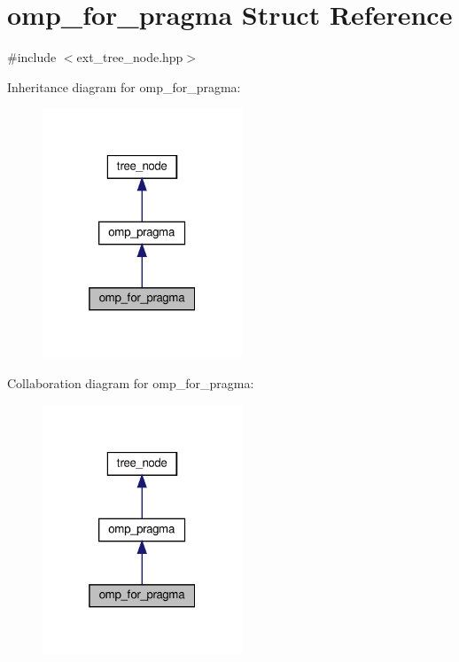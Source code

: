 \hypertarget{structomp__for__pragma}{}\section{omp\+\_\+for\+\_\+pragma Struct Reference}
\label{structomp__for__pragma}


{\ttfamily \#include $<$ext\+\_\+tree\+\_\+node.\+hpp$>$}



Inheritance diagram for omp\+\_\+for\+\_\+pragma\+:
\nopagebreak
\begin{figure}[H]
\begin{center}
\leavevmode
\includegraphics[width=169pt]{dd/de4/structomp__for__pragma__inherit__graph}
\end{center}
\end{figure}


Collaboration diagram for omp\+\_\+for\+\_\+pragma\+:
\nopagebreak
\begin{figure}[H]
\begin{center}
\leavevmode
\includegraphics[width=169pt]{d2/df4/structomp__for__pragma__coll__graph}
\end{center}
\end{figure}
